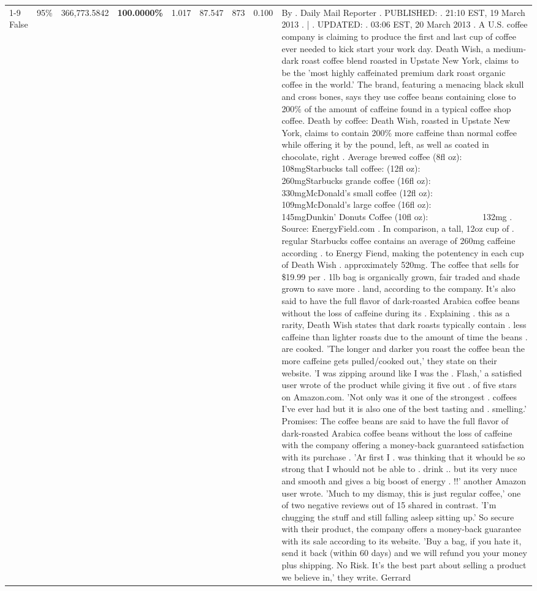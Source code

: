 \begin{table}[H]
{\begin{tabular}{lllrlllll}
\cline{1-9} \cline{2-9}
False & 95\% & 366,773.5842 & \bfseries \color{red} 100.0000\% & 1.017 & 87.547 & 873 & 0.100 & By . Daily Mail Reporter . PUBLISHED: . 21:10 EST, 19 March 2013 . | . UPDATED: . 03:06 EST, 20 March 2013 . A U.S. coffee company is claiming to produce the first and last cup of coffee ever needed to kick start your work day. Death Wish, a medium-dark roast coffee blend roasted in Upstate New York, claims to be the 'most highly caffeinated premium dark roast organic coffee in the world.' The brand, featuring a menacing black skull and cross bones, says they use coffee beans containing close to 200\% of the amount of caffeine found in a typical coffee shop coffee. Death by coffee: Death Wish, roasted in Upstate New York, claims to contain 200\% more caffeine than normal coffee while offering it by the pound, left, as well as coated in chocolate, right . Average brewed coffee (8fl oz):              108mgStarbucks tall coffee: (12fl oz):                260mgStarbucks grande coffee (16fl oz):         330mgMcDonald's small coffee (12fl oz):           109mgMcDonald's large coffee (16fl oz):           145mgDunkin' Donuts Coffee (10fl oz):             132mg . Source: EnergyField.com . In comparison, a tall, 12oz cup of . regular Starbucks coffee contains an average of 260mg caffeine according . to Energy Fiend, making the potentency in each cup of Death Wish . approximately 520mg. The coffee that sells for \$19.99 per . 1lb bag is organically grown, fair traded and shade grown to save more . land, according to the company. It's also said to have the full flavor of dark-roasted Arabica coffee beans without the loss of caffeine during its . Explaining . this as a rarity, Death Wish states that dark roasts typically contain . less caffeine than lighter roasts due to the amount of time the beans . are cooked. 'The longer and darker you roast the coffee bean the more caffeine gets pulled/cooked out,' they state on their website. 'I was zipping around like I was the . Flash,' a satisfied user wrote of the product while giving it five out . of five stars on Amazon.com. 'Not only was it one of the strongest . coffees I've ever had but it is also one of the best tasting and . smelling.’ Promises: The coffee beans are said to have the full flavor of dark-roasted Arabica coffee beans without the loss of caffeine with the company offering a money-back guaranteed satisfaction with its purchase . 'Ar first I . was thinking that it whould be so strong that I whould not be able to . drink .. but its very nuce and smooth and gives a big boost of energy . !!' another Amazon user wrote. 'Much to my dismay, this is just regular coffee,' one of two negative reviews out of 15 shared in contrast. 'I'm chugging the stuff and still falling asleep sitting up.' So secure with their product, the company offers a money-back guarantee with its sale according to its website. 'Buy a bag, if you hate it, send it back (within 60 days) and we will refund you your money plus shipping. No Risk. It’s the best part about selling a product we believe in,' they write. Gerrard \\

\end{tabular}}
\end{table}
